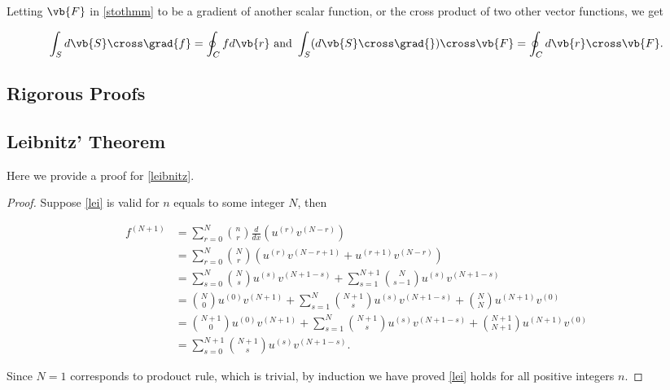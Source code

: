 \documentclass[english,a4paper,12pt]{report}
\begin{document}
Letting \(\vb{F} \) in \cref{stothmm} to be a gradient of another scalar function, or the cross product of two other vector functions, we get 

\begin{equation}
	\int_{S}^{} d\vb{S} \cross \grad{f} = \oint_{C} fd\vb{r} \text { and } \int_{S}^{} (d\vb{S} \cross \grad{} ) \cross \vb{F} = \oint_{C} d\vb{r} \cross \vb{F} .    
\end{equation}
















\begin{appendices}
\chapter{Rigorous Proofs}
\section{Leibnitz' Theorem} \label{leibnitzapp} 

Here we provide a proof for \cref{leibnitz}.

\begin{proof}
Suppose \cref{lei} is valid for \(n\) equals to some integer \(N\), then

\begin{equation}
    \begin{aligned}
        f^{(N+1)} &= \sum_{r=0}^{N} \binom{n}{r} \frac{d}{dx}(u^{(r)} v^{(N-r)} ) \\
        &= \sum_{r=0}^{N} \binom{N}{r} (u^{(r)} v^{(N-r+1)} + u^{(r+1)}v^{(N-r)}  ) \\
        &= \sum_{s=0}^{N} \binom{N}{s}u^{(s)}v^{(N+1-s)} + \sum_{s=1}^{N+1} \binom{N}{s-1} u^{(s)}v^{(N+1-s)} \\
        &= \binom{N}{0}u^{(0)} v^{(N+1)} + \sum_{s=1}^{N} \binom{N+1}{s}u^{(s)}v^{(N+1-s)} + \binom{N}{N}u^{(N+1)} v^{(0)} \\
        &= \binom{N+1}{0}u^{(0)} v^{(N+1)} + \sum_{s=1}^{N} \binom{N+1}{s}u^{(s)}v^{(N+1-s)} + \binom{N+1}{N+1}u^{(N+1)} v^{(0)} \\
        &= \sum_{s=0}^{N+1} \binom{N+1}{s} u^{(s)}v^{(N+1-s)}.  
    \end{aligned}
\end{equation}

Since \(N=1\) corresponds to prodouct rule, which is trivial, by induction we have proved \cref{lei} holds for all positive integers \(n\). 

\end{proof}


\end{appendices}
\end{document}
